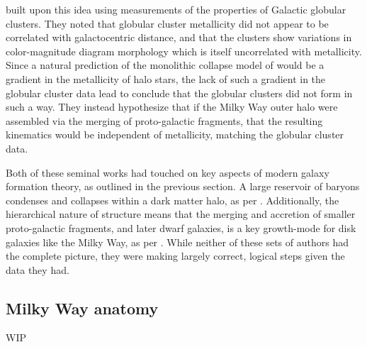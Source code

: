 \textcite{searle78} built upon this idea using measurements of the properties of Galactic globular clusters. They noted that globular cluster metallicity did not appear to be correlated with galactocentric distance, and that the clusters show variations in color-magnitude diagram morphology which is itself uncorrelated with metallicity. Since a natural prediction of the monolithic collapse model of \textcite{eggen62} would be a gradient in the metallicity of halo stars, the lack of such a gradient in the globular cluster data lead \textcite{searle78} to conclude that the globular clusters did not form in such a way. They instead hypothesize that if the Milky Way outer halo were assembled via the merging of proto-galactic fragments, that the resulting kinematics would be independent of metallicity, matching the globular cluster data.

Both of these seminal works had touched on key aspects of modern galaxy formation theory, as outlined in the previous section. A large reservoir of baryons condenses and collapses within a dark matter halo, as per \textcite{eggen62}. Additionally, the hierarchical nature of structure means that the merging and accretion of smaller proto-galactic fragments, and later dwarf galaxies, is a key growth-mode for disk galaxies like the Milky Way, as per \textcite{searle78}. While neither of these sets of authors had the complete picture, they were making largely correct, logical steps given the data they had.

\subsection{Milky Way anatomy}

WIP


